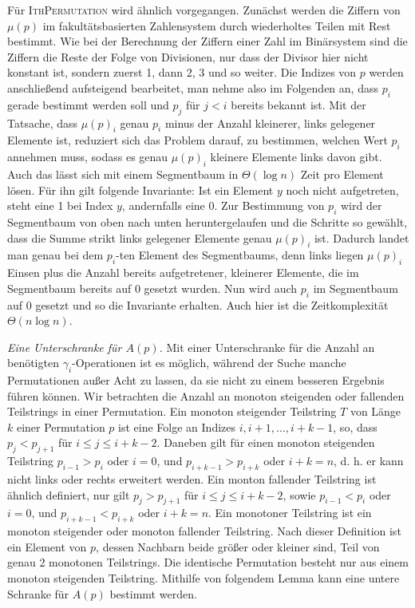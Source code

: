\documentclass[a4paper, 10pt, ngerman]{article}
\begin{document}
Für \textsc{IthPermutation} wird ähnlich vorgegangen. Zunächst werden die Ziffern von $\mu(p)$ im fakultätsbasierten Zahlensystem durch wiederholtes Teilen mit Rest bestimmt. Wie bei der Berechnung der Ziffern einer Zahl im Binärsystem sind die Ziffern die Reste der Folge von Divisionen, nur dass der Divisor hier nicht konstant ist, sondern zuerst 1, dann 2, 3 und so weiter. Die Indizes von $p$ werden anschließend aufsteigend bearbeitet, man nehme also im Folgenden an, dass $p_i$ gerade bestimmt werden soll und $p_j$ für $j < i$ bereits bekannt ist. Mit der Tatsache, dass $\mu(p)_i$ genau $p_i$ minus der Anzahl kleinerer, links gelegener Elemente ist, reduziert sich das Problem darauf, zu bestimmen, welchen Wert $p_i$ annehmen muss, sodass es genau $\mu(p)_i$ kleinere Elemente links davon gibt. Auch das lässt sich mit einem Segmentbaum in $\Theta(\log n)$ Zeit pro Element lösen. Für ihn gilt folgende Invariante: Ist ein Element $y$ noch nicht aufgetreten, steht eine 1 bei Index $y$, andernfalls eine 0. Zur Bestimmung von $p_i$ wird der Segmentbaum von oben nach unten heruntergelaufen und die Schritte so gewählt, dass die Summe strikt links gelegener Elemente genau $\mu(p)_i$ ist. Dadurch landet man genau bei dem $p_i$-ten Element des Segmentbaums, denn links liegen $\mu(p)_i$ Einsen plus die Anzahl bereits aufgetretener, kleinerer Elemente, die im Segmentbaum bereits auf 0 gesetzt wurden. Nun wird auch $p_i$ im Segmentbaum auf 0 gesetzt und so die Invariante erhalten. Auch hier ist die Zeitkomplexität $\Theta(n \log n)$.
\medskip

\emph{{Eine Unterschranke für $A(p)$.}} Mit einer Unterschranke für die Anzahl an benötigten $\gamma_i$-Operationen ist es möglich, während der Suche manche Permutationen außer Acht zu lassen, da sie nicht zu einem besseren Ergebnis führen können. Wir betrachten die Anzahl an monoton steigenden oder fallenden Teilstrings in einer Permutation. Ein monoton steigender Teilstring $T$ von Länge $k$ einer Permutation $p$ ist eine Folge an Indizes $i, i + 1, \dots, i + k - 1$, so, dass $p_j < p_{j+1}$ für $i \le j \le i+ k - 2$. Daneben gilt für einen monoton steigenden Teilstring $p_{i - 1} > p_i$ oder $i = 0$, und $p_{i + k - 1} > p_{i + k}$ oder $i + k = n$, d. h. er kann nicht links oder rechts erweitert werden. Ein monton fallender Teilstring ist ähnlich definiert, nur gilt $p_j > p_{j+1}$ für $i \le j \le i + k - 2$, sowie $p_{i - 1} < p_i$ oder $i = 0$, und $p_{i + k - 1} < p_{i + k}$ oder $i + k = n$. Ein monotoner Teilstring ist ein monoton steigender oder monoton fallender Teilstring. Nach dieser Definition ist ein Element von $p$, dessen Nachbarn beide größer oder kleiner sind, Teil von genau 2 monotonen Teilstrings. Die identische Permutation besteht nur aus einem monoton steigenden Teilstring. Mithilfe von folgendem Lemma kann eine untere Schranke für $A(p)$ bestimmt werden.
\end{document}

